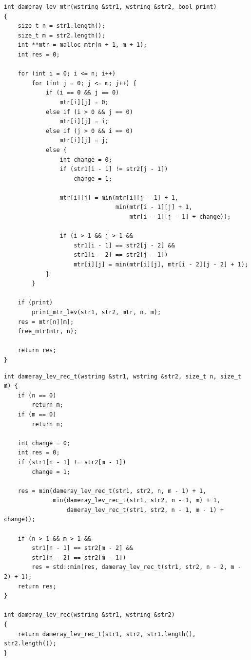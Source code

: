 \documentclass[a4paper,14pt, unknownkeysallowed]{bmstu}
\begin{document}
\clearpage

\begin{lstlisting}[label=lst:dameray_lev_rec,caption=Функция нахождения расстояния Дамерау-Левенштейна с использованием матрицы]
int dameray_lev_mtr(wstring &str1, wstring &str2, bool print)
{
    size_t n = str1.length();
    size_t m = str2.length();
    int **mtr = malloc_mtr(n + 1, m + 1);
    int res = 0;

    for (int i = 0; i <= n; i++)
        for (int j = 0; j <= m; j++) {
            if (i == 0 && j == 0)
                mtr[i][j] = 0;
            else if (i > 0 && j == 0)
                mtr[i][j] = i;
            else if (j > 0 && i == 0)
                mtr[i][j] = j;
            else {
                int change = 0;
                if (str1[i - 1] != str2[j - 1])
                    change = 1;

                mtr[i][j] = min(mtr[i][j - 1] + 1,
                                min(mtr[i - 1][j] + 1,
                                    mtr[i - 1][j - 1] + change));

                if (i > 1 && j > 1 &&
                    str1[i - 1] == str2[j - 2] &&
                    str1[i - 2] == str2[j - 1])
                    mtr[i][j] = min(mtr[i][j], mtr[i - 2][j - 2] + 1);
            }
        }

    if (print)
        print_mtr_lev(str1, str2, mtr, n, m);
    res = mtr[n][m];
    free_mtr(mtr, n);

    return res;
}
\end{lstlisting}

\clearpage

\begin{lstlisting}[label=lst:dameray_lev_mtr,caption=Функция нахождения расстояния Дамерау-Левенштейна рекурсивно]
int dameray_lev_rec_t(wstring &str1, wstring &str2, size_t n, size_t m) {
    if (n == 0)
        return m;
    if (m == 0)
        return n;

    int change = 0;
    int res = 0;
    if (str1[n - 1] != str2[m - 1])
        change = 1;

    res = min(dameray_lev_rec_t(str1, str2, n, m - 1) + 1,
              min(dameray_lev_rec_t(str1, str2, n - 1, m) + 1,
                  dameray_lev_rec_t(str1, str2, n - 1, m - 1) + change));

    if (n > 1 && m > 1 &&
        str1[n - 1] == str2[m - 2] &&
        str1[n - 2] == str2[m - 1])
        res = std::min(res, dameray_lev_rec_t(str1, str2, n - 2, m - 2) + 1);
    return res;
}

int dameray_lev_rec(wstring &str1, wstring &str2)
{
    return dameray_lev_rec_t(str1, str2, str1.length(), str2.length());
}
\end{lstlisting}
\end{document}
